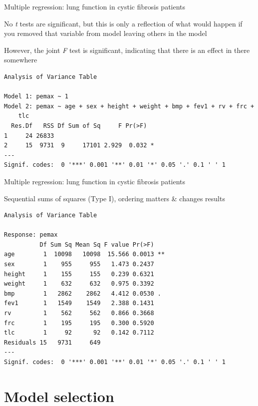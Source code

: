 \documentclass[10pt,ignorenonframetext,compress, aspectratio=169]{beamer}
\begin{document}
\begin{frame}[fragile]{Multiple regression: lung function in cystic
fibrosis patients}

No \emph{t} tests are significant, but this is only a reflection of what
would happen if you removed that variable from model leaving others in
the model

However, the joint \emph{F} test is significant, indicating that there
is an effect in there somewhere

\scriptsize

\begin{verbatim}
Analysis of Variance Table

Model 1: pemax ~ 1
Model 2: pemax ~ age + sex + height + weight + bmp + fev1 + rv + frc + 
    tlc
  Res.Df   RSS Df Sum of Sq     F Pr(>F)  
1     24 26833                            
2     15  9731  9     17101 2.929  0.032 *
---
Signif. codes:  0 '***' 0.001 '**' 0.01 '*' 0.05 '.' 0.1 ' ' 1
\end{verbatim}

\normalsize

\end{frame}

\begin{frame}[fragile]{Multiple regression: lung function in cystic
fibrosis patients}

\alert{Sequential sums of squares} (Type I), ordering matters \& changes
results

\scriptsize

\begin{verbatim}
Analysis of Variance Table

Response: pemax
          Df Sum Sq Mean Sq F value Pr(>F)   
age        1  10098   10098  15.566 0.0013 **
sex        1    955     955   1.473 0.2437   
height     1    155     155   0.239 0.6321   
weight     1    632     632   0.975 0.3392   
bmp        1   2862    2862   4.412 0.0530 . 
fev1       1   1549    1549   2.388 0.1431   
rv         1    562     562   0.866 0.3668   
frc        1    195     195   0.300 0.5920   
tlc        1     92      92   0.142 0.7112   
Residuals 15   9731     649                  
---
Signif. codes:  0 '***' 0.001 '**' 0.01 '*' 0.05 '.' 0.1 ' ' 1
\end{verbatim}

\normalsize

\end{frame}

\section{Model selection}\label{model-selection}
\end{document}
